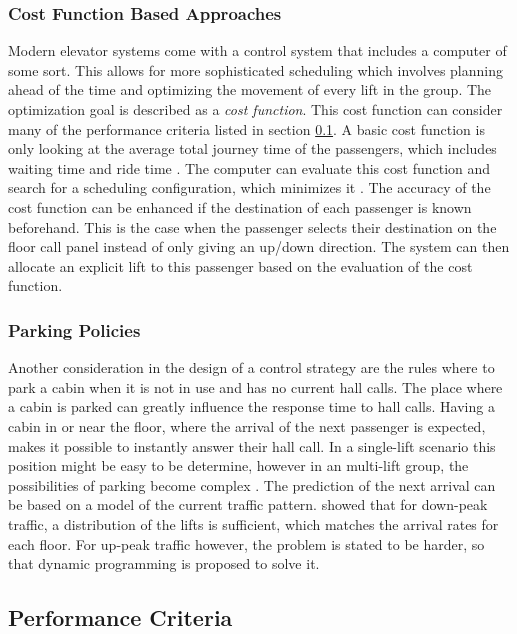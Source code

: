 \subsubsection{Cost Function Based Approaches}
Modern elevator systems come with a control system that includes a computer of some sort.
This allows for more sophisticated scheduling which involves planning ahead of the time and optimizing the movement of every lift in the group.
\autocite[][pp.261ff]{barney2016handbook}
The optimization goal is described as a \emph{cost function}.
This cost function can consider many of the performance criteria listed in section \ref{sec:sota:perf}.
A basic cost function is only looking at the average total journey time of the passengers, which includes waiting time and ride time
\autocite[][pp.278ff]{barney2016handbook}.
The computer can evaluate this cost function and search for a scheduling configuration, which minimizes it 
\autocite[][pp.~3--6]{axelsson2013strategies}.
The accuracy of the cost function can be enhanced if 
the destination of each passenger is known beforehand.
This is the case when the passenger selects their destination on the floor call panel instead of only giving an up/down direction.
The system can then allocate an explicit lift to this passenger based on the evaluation of the cost function.

\subsubsection{Parking Policies}
Another consideration in the design of a control strategy are the rules where to park a cabin when it is not in use and has no current hall calls.
The place where a cabin is parked can greatly influence the response time to hall calls.
Having a cabin in or near the floor, where the arrival of the next passenger is expected, 
makes it possible to instantly answer their hall call.
In a single-lift scenario this position might be easy to be determine, 
however in an multi-lift group, the possibilities of parking become complex \autocite[][pp.~3]{beers2015arrivals}.
The prediction of the next arrival can be based on a model of the current traffic pattern.
\textcite{brand2004parking} showed that for down-peak traffic, a distribution of the lifts is sufficient, which matches the arrival rates for each floor.
For up-peak traffic however, the problem is stated to be harder, 
so that dynamic programming is proposed to solve it.


\subsection{Performance Criteria}
\label{sec:sota:perf}

